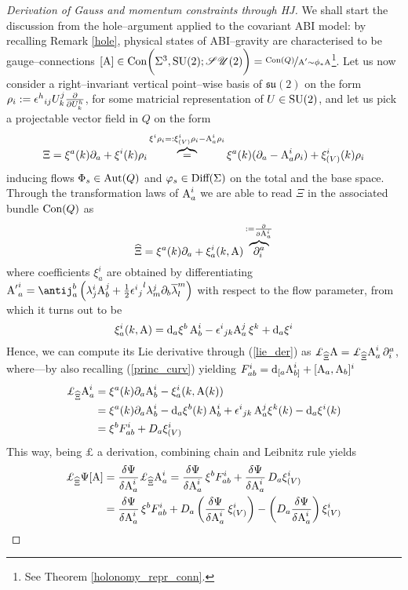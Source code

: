 \begin{proof}[Derivation of Gauss and momentum constraints through HJ]\label{ABI_states}
    We shall start the discussion from the hole--argument applied to the covariant ABI model: by recalling Remark \ref{hole}, physical states of ABI--gravity are characterised to be gauge--connections $[\text{\normalfont A}]\in\text{\normalfont Con}\bigg(\Sigma^3,\text{\normalfont SU}(2);\mathscr{SU}(2)\bigg)=\nicefrac{\text{\normalfont Con}(Q)}{\text{\normalfont\scriptsize{A}}'\sim\phi_*\text{\normalfont\scriptsize{A}}}$\footnote{See Theorem \ref{holonomy_repr_conn}.}. Let us now consider a right--invariant vertical point--wise basis of $\mathfrak{su}(2)$ on the form $\rho_i:={\epsilon^h}_{ij}U^j_k\frac{\partial}{\partial U^h_k}$, for some matricial representation of $U\in\text{\normalfont SU}(2)$, and let us pick a projectable vector field in $Q$ on the form
    $$\Xi=\xi^a(k)\partial_a+\xi^i(k)\rho_i\overbrace{=}^{\xi^i\rho_i=:\xi^i_{(V)}\rho_i-\text{\normalfont A}^i_a\rho_i}\xi^a(k)(\partial_a-\text{\normalfont A}^i_a\rho_i)+\xi^i_{(V)}(k)\rho_i$$
    inducing flows $\Phi_s\in\text{\normalfont Aut}(Q)$ and $\varphi_s\in\text{\normalfont Diff}(\Sigma)$ on the total and the base space. Through the transformation laws of $\text{\normalfont A}^i_a$ we are able to read $\Xi$ in the associated bundle $\text{\normalfont Con}(Q)$ as
    $$\widehat{\Xi}=\xi^a(k)\partial_a+\xi^i_a(k,\text{\normalfont A})\overbrace{\partial_i^a}^{:=\frac{\partial}{\partial\text{\normalfont\scriptsize{A}}^i_a}}$$
    where coefficients $\xi^i_a$ are obtained by differentiating ${\A'}^i_a=\antij^b_a\left(\lambda^i_j\A_b^j+\frac{1}{2}{{\epsilon^i}_j}^l\lambda^j_m\der_b\overline{\lambda}^m_l\right)$ with respect to the flow parameter, from which it turns out to be
    $$\xi^i_a(k,\text{\normalfont A})=\text{\normalfont d}_a\xi^b\,\text{\normalfont A}^i_b-{\epsilon^i}_{jk}\text{\normalfont A}^j_a\,\xi^k+\text{\normalfont d}_a\xi^i$$
    Hence, we can compute its Lie derivative through (\ref{lie_der}) as $\pounds_{\widehat{\Xi}}\A=\pounds_{\widehat{\Xi}}\A^i_a\,\der_i^a$, where---by also recalling (\ref{princ_curv}) yielding $F^i_{ab}=\text{\normalfont d}_{[a}\text{\normalfont A}^i_{b]}+[\text{\normalfont A}_a,\text{\normalfont A}_b]^i$
    \begin{align*}
        \pounds_{\widehat{\Xi}}\A^i_a&=\xi^a(k)\der_a\A^i_b-\xi^i_a(k,\A(k))\\
        &=\xi^a(k)\der_a\A^i_b-\d_a\xi^b(k)\,\A_b^i+{\epsilon^i}_{jk}\,\A^j_a\xi^k(k)-\d_a\xi^i(k)\\
        &=\xi^b F^i_{ab}+D_a\xi^i_{(V)}
    \end{align*}
    This way, being $\pounds$ a derivation, combining chain and Leibnitz rule yields
    \begin{align*}
        \pounds_{\widehat{\Xi}}\Psi[\A]&=\frac{\delta\Psi}{\delta\A^i_a}\pounds_{\widehat{\Xi}}\A^i_a=\frac{\delta\Psi}{\delta\A^i_a}\,\xi^bF^i_{ab}+\frac{\delta\Psi}{\delta\A^i_a}\,D_a\xi^i_{(V)}\\
        &=\frac{\delta\Psi}{\delta\A^i_a}\,\xi^b F^i_{ab}+D_a\left(\frac{\delta\Psi}{\delta\A^i_a}\,\xi^i_{(V)}\right)-\left(D_a\frac{\delta\Psi}{\delta\A^i_a}\right)\xi^i_{(V)}

\end{align*}
\end{proof}
